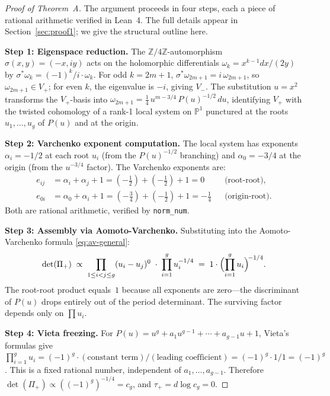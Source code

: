 \documentclass[11pt]{article}
\theoremstyle{plain}
\theoremstyle{definition}
\theoremstyle{remark}
\newcommand{\ZZ}{\mathbb{Z}}
\newcommand{\PP}{\mathbb{P}}
\begin{document}
\begin{proof}[Proof of Theorem~A]
The argument proceeds in four steps, each a piece of rational arithmetic
verified in Lean~4.  The full details appear in Section~\ref{sec:proof1};
we give the structural outline here.

\textbf{Step 1: Eigenspace reduction.}
The $\ZZ/4\ZZ$-automorphism $\sigma(x,y) = (-x,iy)$ acts on the holomorphic
differentials $\omega_k = x^{k-1}dx/(2y)$ by $\sigma^*\omega_k =
(-1)^k/i \cdot \omega_k$.  For odd $k = 2m+1$, $\sigma^*\omega_{2m+1} = i\,\omega_{2m+1}$,
so $\omega_{2m+1} \in V_+$; for even $k$, the eigenvalue is $-i$, giving $V_-$.
The substitution $u = x^2$ transforms the $V_+$-basis into
$\omega_{2m+1} = \tfrac{1}{4}\,u^{m-3/4}\,P(u)^{-1/2}\,du$,
identifying $V_+$ with the twisted cohomology of a rank-1 local system on
$\PP^1$ punctured at the roots $u_1,\ldots,u_g$ of $P(u)$ and at the origin.

\textbf{Step 2: Varchenko exponent computation.}
The local system has exponents $\alpha_i = -1/2$ at each root $u_i$ (from the
$P(u)^{-1/2}$ branching) and $\alpha_0 = -3/4$ at the origin (from the
$u^{-3/4}$ factor).  The Varchenko exponents are:
\begin{align*}
  e_{ij} &= \alpha_i + \alpha_j + 1 = (-\tfrac{1}{2}) + (-\tfrac{1}{2}) + 1 = 0
    && \text{(root-root)}, \\
  e_{0i} &= \alpha_0 + \alpha_i + 1 = (-\tfrac{3}{4}) + (-\tfrac{1}{2}) + 1 = -\tfrac{1}{4}
    && \text{(origin-root)}.
\end{align*}
Both are rational arithmetic, verified by \texttt{norm\_num}.

\textbf{Step 3: Assembly via Aomoto-Varchenko.}
Substituting into the Aomoto-Varchenko formula \eqref{eq:av-general}:
\[
  \det(\Pi_+) \;\propto\;
  \prod_{1 \le i < j \le g} (u_i - u_j)^{0}
  \;\cdot\;
  \prod_{i=1}^{g} u_i^{-1/4}
  \;=\; 1 \cdot \Bigl(\prod_{i=1}^g u_i\Bigr)^{\!-1/4}.
\]
The root-root product equals~$1$ because all exponents are zero---the
discriminant of $P(u)$ drops entirely out of the period determinant.
The surviving factor depends only on $\prod u_i$.

\textbf{Step 4: Vieta freezing.}
For $P(u) = u^g + a_1 u^{g-1} + \cdots + a_{g-1}u + 1$, Vieta's formulas give
$\prod_{i=1}^g u_i = (-1)^g \cdot (\text{constant term})/(\text{leading coefficient})
= (-1)^g \cdot 1/1 = (-1)^g$.
This is a fixed rational number, independent of $a_1,\ldots,a_{g-1}$.
Therefore $\det(\Pi_+) \propto ((-1)^g)^{-1/4} = c_g$, and
$\tau_+ = d\log c_g = 0$.
\end{proof}
\end{document}
